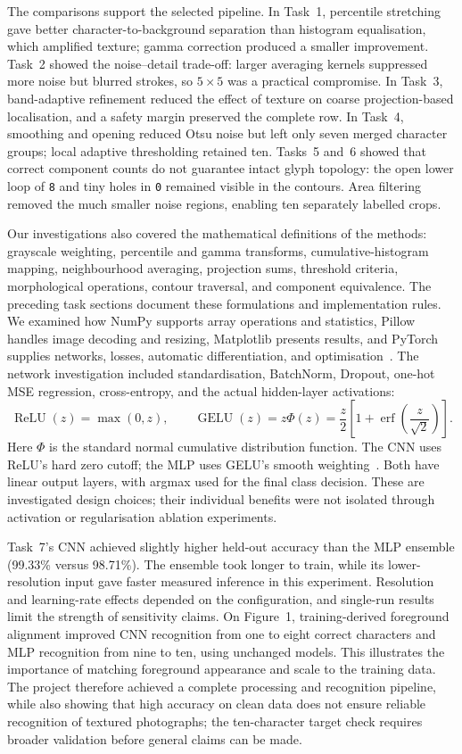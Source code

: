 \documentclass[11pt,a4paper]{article}
\numberwithin{figure}{section}
\numberwithin{table}{section}
\numberwithin{equation}{section}
\begin{document}
The comparisons support the selected pipeline.  In Task~1, percentile
stretching gave better character-to-background separation than histogram
equalisation, which amplified texture; gamma correction produced a smaller
improvement.  Task~2 showed the noise--detail trade-off: larger averaging
kernels suppressed more noise but blurred strokes, so $5\times5$ was a
practical compromise.  In Task~3, band-adaptive refinement reduced the effect
of texture on coarse projection-based localisation, and a safety margin
preserved the complete row.  In Task~4, smoothing and opening reduced Otsu
noise but left only seven merged character groups; local adaptive thresholding
retained ten.  Tasks~5 and~6 showed that correct component counts do not
guarantee intact glyph topology: the open lower loop of \texttt{8} and tiny
holes in \texttt{0} remained visible in the contours.  Area filtering removed
the much smaller noise regions, enabling ten separately labelled crops.

Our investigations also covered the mathematical definitions of the methods:
grayscale weighting, percentile and gamma transforms, cumulative-histogram
mapping, neighbourhood averaging, projection sums, threshold criteria,
morphological operations, contour traversal, and component equivalence.
The preceding task sections document these formulations and implementation
rules.  We examined how NumPy supports array operations and statistics,
Pillow handles image decoding and resizing, Matplotlib presents results,
and PyTorch supplies networks, losses, automatic differentiation, and
optimisation~\cite{numpy,pillow,matplotlib,pytorch}.  The network investigation
included standardisation, BatchNorm, Dropout, one-hot MSE regression,
cross-entropy, and the actual hidden-layer activations:
\[
  \operatorname{ReLU}(z)=\max(0,z),\qquad
  \operatorname{GELU}(z)=z\Phi(z)
  =\frac{z}{2}\left[1+\operatorname{erf}\!\left(\frac{z}{\sqrt{2}}\right)\right].
\]
Here $\Phi$ is the standard normal cumulative distribution function.
The CNN uses ReLU's hard zero cutoff; the MLP uses GELU's smooth
weighting~\cite{gelu}.  Both have linear output layers, with argmax used for
the final class decision.  These are investigated design choices; their
individual benefits were not isolated through activation or regularisation
ablation experiments.

Task~7's CNN achieved slightly higher held-out accuracy than the MLP ensemble
(99.33\% versus 98.71\%).  The ensemble took longer to train, while its
lower-resolution input gave faster measured inference in this experiment.
Resolution and learning-rate effects depended on the configuration, and
single-run results limit the strength of sensitivity claims.  On Figure~1,
training-derived foreground alignment improved CNN recognition from one to
eight correct characters and MLP recognition from nine to ten, using unchanged
models.  This illustrates the importance of matching foreground appearance
and scale to the training data.  The project therefore achieved a complete
processing and recognition pipeline, while also showing that high accuracy
on clean data does not ensure reliable recognition of textured photographs;
the ten-character target check requires broader validation before general
claims can be made.

\FloatBarrier
{}
{}


\end{document}
